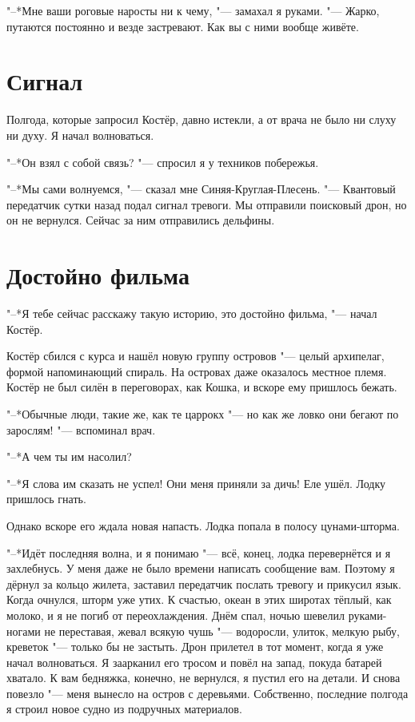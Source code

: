 \documentclass[a4paper,10pt]{book}
\begin{document}
"--*Мне ваши роговые наросты ни к чему, "--- замахал я руками. "--- Жарко, путаются постоянно и везде застревают. Как вы с ними вообще живёте.
 
 \section{Сигнал}

 Полгода, которые запросил Костёр, давно истекли, а от врача не было ни слуху ни духу. Я начал волноваться.

"--*Он взял с собой связь? "--- спросил я у техников побережья.

"--*Мы сами волнуемся, "--- сказал мне Синяя-Круглая-Плесень. "--- Квантовый передатчик сутки назад подал сигнал тревоги. Мы отправили поисковый дрон, но он не вернулся. Сейчас за ним отправились дельфины.

\section{Достойно фильма}

"--*Я тебе сейчас расскажу такую историю, это достойно фильма, "--- начал Костёр.

Костёр сбился с курса и нашёл новую группу островов "--- целый архипелаг, формой напоминающий спираль. На островах даже оказалось местное племя. Костёр не был силён в переговорах, как Кошка, и вскоре ему пришлось бежать.

"--*Обычные люди, такие же, как те царрокх "--- но как же ловко они бегают по зарослям! "--- вспоминал врач.

"--*А чем ты им насолил?

"--*Я слова им сказать не успел! Они меня приняли за дичь! Еле ушёл. Лодку пришлось гнать.

Однако вскоре его ждала новая напасть. Лодка попала в полосу цунами-шторма.

"--*Идёт последняя волна, и я понимаю "--- всё, конец, лодка перевернётся и я захлебнусь. У меня даже не было времени написать сообщение вам. Поэтому я дёрнул за кольцо жилета, заставил передатчик послать тревогу и прикусил язык. Когда очнулся, шторм уже утих. К счастью, океан в этих широтах тёплый, как молоко, и я не погиб от переохлаждения. Днём спал, ночью шевелил руками-ногами не переставая, жевал всякую чушь "--- водоросли, улиток, мелкую рыбу, креветок "--- только бы не застыть. Дрон прилетел в тот момент, когда я уже начал волноваться. Я заарканил его тросом и повёл на запад, покуда батарей хватало. К вам бедняжка, конечно, не вернулся, я пустил его на детали. И снова повезло "--- меня вынесло на остров с деревьями. Собственно, последние полгода я строил новое судно из подручных материалов.
\end{document}
